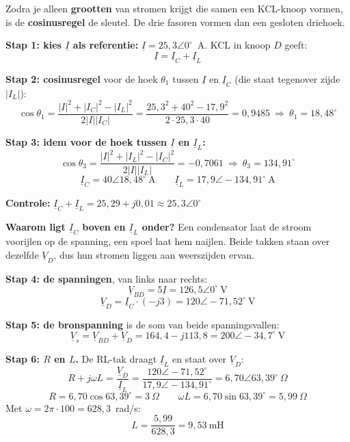 \documentclass[a4paper,11pt]{article}
\begin{document}
\begin{oefenblok}

    \begin{examenbox}
        Zodra je alleen \textbf{grootten} van stromen krijgt die samen een KCL-knoop vormen, is de
        \textbf{cosinusregel} de sleutel. De drie fasoren vormen dan een gesloten driehoek.
    \end{examenbox}

    \textbf{Stap 1: kies $\underline{I}$ als referentie:} $\underline{I} = 25{,}3\angle 0^\circ$~A.
    KCL in knoop $D$ geeft:
    \[\underline{I} = \underline{I}_C + \underline{I}_L\]

    \textbf{Stap 2: cosinusregel} voor de hoek $\theta_1$ tussen $\underline{I}$ en
    $\underline{I}_C$ (die staat tegenover zijde $|I_L|$):
    \[\cos\theta_1 = \frac{|I|^2 + |I_C|^2 - |I_L|^2}{2|I||I_C|}
        = \frac{25{,}3^2 + 40^2 - 17{,}9^2}{2 \cdot 25{,}3 \cdot 40} = 0{,}9485
        \ \Rightarrow\ \theta_1 = 18{,}48^\circ\]

    \textbf{Stap 3: idem voor de hoek tussen $\underline{I}$ en $\underline{I}_L$:}
    \[\cos\theta_3 = \frac{|I|^2 + |I_L|^2 - |I_C|^2}{2|I||I_L|} = -0{,}7061
        \ \Rightarrow\ \theta_3 = 134{,}91^\circ\]
    \[\underline{I}_C = 40\angle 18{,}48^\circ\ \text{A} \qquad
        \underline{I}_L = 17{,}9\angle -134{,}91^\circ\ \text{A}\]

    \textbf{Controle:} $\underline{I}_C + \underline{I}_L = 25{,}29 + j0{,}01 \approx 25{,}3\angle 0^\circ$ \checkmark

    \textbf{Waarom ligt $\underline{I}_C$ boven en $\underline{I}_L$ onder?} Een condensator laat de
    stroom voorijlen op de spanning, een spoel laat hem naijlen. Beide takken staan over dezelfde
    $\underline{V}_D$, dus hun stromen liggen aan weerszijden ervan.

    \textbf{Stap 4: de spanningen}, van links naar rechts:
    \[\underline{V}_{BD} = 5\underline{I} = 126{,}5\angle 0^\circ\ \text{V}\]
    \[\underline{V}_D = \underline{I}_C \cdot (-j3) = 120\angle -71{,}52^\circ\ \text{V}\]

    \textbf{Stap 5: de bronspanning} is de som van beide spanningsvallen:
    \[\underline{V}_s = \underline{V}_{BD} + \underline{V}_D = 164{,}4 - j113{,}8 = \boxed{200\angle -34{,}7^\circ\ \text{V}}\]

    \textbf{Stap 6: $R$ en $L$.} De RL-tak draagt $\underline{I}_L$ en staat over $\underline{V}_D$:
    \[R + j\omega L = \frac{\underline{V}_D}{\underline{I}_L}
        = \frac{120\angle -71{,}52^\circ}{17{,}9\angle -134{,}91^\circ} = 6{,}70\angle 63{,}39^\circ\ \Omega\]
    \[R = 6{,}70\cos 63{,}39^\circ = \boxed{3\ \Omega} \qquad \omega L = 6{,}70\sin 63{,}39^\circ = 5{,}99\ \Omega\]
    Met $\omega = 2\pi \cdot 100 = 628{,}3$~rad/s:
    \[L = \frac{5{,}99}{628{,}3} = \boxed{9{,}53\ \text{mH}}\]


\end{oefenblok}
\end{document}
